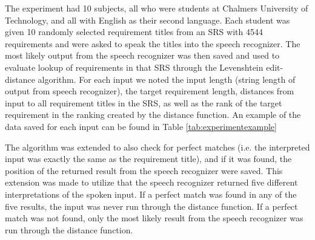 The experiment had 10 subjects, all who were students at Chalmers University of Technology, and all with English as their second language. 
Each student was given 10 randomly selected requirement titles from an SRS with 4544 requirements and were asked to speak the titles into the speech recognizer. 
The most likely output from the speech recognizer was then saved and used to evaluate lookup of requirements in that SRS through the Levenshtein edit-distance algorithm.
For each input we noted the input length (string length of output from speech recognizer), the target requirement length, distances from input to all requirement titles in the SRS, as well as the rank of the target requirement in the ranking created by the distance function.
An example of the data saved for each input can be found in Table \ref{tab:experimentexample} 

The algorithm was extended to also check for perfect matches (i.e. the interpreted input was exactly the same as the requirement title), and if it was found, the position of the returned result from the speech recognizer were saved. This extension was made to utilize that the speech recognizer returned five different interpretations of the spoken input. If a perfect match was found in any of the five results, the input was never run through the distance function. If a perfect match was not found, only the most likely result from the speech recognizer was run through the distance function. 

